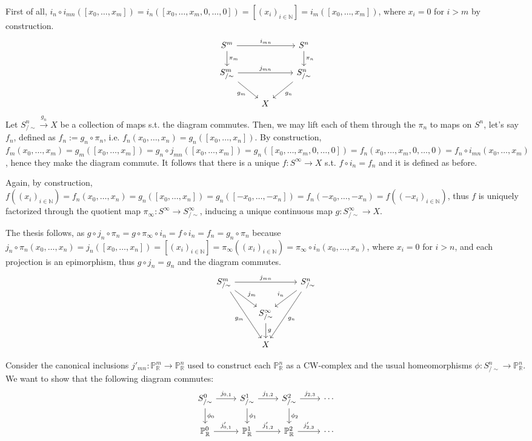 \documentclass{article}
\newcommand{\numberset}{\mathbb}
\newcommand{\N}{\numberset{N}}
\newcommand{\R}{\numberset{R}}
\newcommand{\Ps}{\mathbb{P}}
\begin{document}
First of all, $i_n\circ i_{mn}([x_0,\ldots,x_m])=i_n([x_0,\ldots,x_m,0,\ldots,0])=[(x_i)_{i\in\N}]=i_m([x_0,\ldots,x_m])$, where $x_i=0$ for $i>m$ by construction.
\[
  \begin{tikzcd}
    S^m\arrow{d}{\pi_m}\arrow{rr}{i_{mn}} & & S^n\arrow{d}{\pi_n} \\
    S^m_{/\sim}\arrow{rr}{j_{mn}}\arrow[swap]{dr}{g_m} & & S^n_{/\sim}\arrow{dl}{g_n} \\
    & X
\end{tikzcd}
\]
Let $S^n_{/\sim}\xrightarrow{g_n} X$ be a collection of maps s.t. the diagram commutes. Then, we may lift each of them through the $\pi_n$ to maps on $S^n$, let's say $f_n$, defined as $f_n:=g_n\circ\pi_n$, i.e. $f_n(x_0,\ldots,x_n)=g_n([x_0,\ldots,x_n])$. By construction, $f_m(x_0,\ldots,x_m)=g_m([x_0,\ldots,x_m])=g_n\circ j_{mn}([x_0,\ldots,x_m])=g_n([x_0,\ldots,x_m,0,\ldots,0])=f_n(x_0,\ldots,x_m,0,\ldots,0)=f_n\circ i_{mn}(x_0,\ldots,x_m)$, hence they make the diagram commute. It follows that there is a unique $f:S^{\infty}\rightarrow X$ s.t. $f\circ i_n=f_n$ and it is defined as before.

Again, by construction, $f((x_i)_{i\in\N})=f_n(x_0,\ldots,x_n)=g_n([x_0,\ldots,x_n])=g_n([-x_0,\ldots,-x_n])=f_n(-x_0,\ldots,-x_n)=f((-x_i)_{i\in\N})$, thus $f$ is uniquely factorized through the quotient map $\pi_{\infty}:S^{\infty}\rightarrow S^{\infty}_{/\sim}$, inducing a unique continuous map $g:S^{\infty}_{/\sim}\rightarrow X$.

The thesis follows, as $g\circ j_n\circ\pi_n=g\circ \pi_{\infty}\circ i_n=f\circ i_n=f_n=g_n\circ\pi_n$ because $j_n\circ\pi_n(x_0,\ldots,x_n)=j_n([x_0,\ldots,x_n])=[(x_i)_{i\in\N}]=\pi_{\infty}((x_i)_{i\in\N})=\pi_{\infty}\circ i_n(x_0,\ldots,x_n)$, where $x_i=0$ for $i>n$, and each projection is an epimorphism, thus $g\circ j_n=g_n$ and the diagram commutes.
\[
  \begin{tikzcd}
    S^m_{/\sim}\arrow{rr}{j_{mn}}\arrow{dr}{j_m}\arrow[swap]{ddr}{g_m} & & S^n_{/\sim}\arrow[swap]{dl}{i_n}\arrow{ddl}{g_n} \\
    & S^{\infty}_{/\sim}\arrow{d}{g} \\
    & X
  \end{tikzcd}
\]

Consider the canonical inclusions $j'_{mn}:\Ps^m_{\R}\rightarrow\Ps^n_{\R}$ used to construct each $\Ps^n_{\R}$ as a CW-complex and the usual homeomorphisms $\phi:S^n_{/\sim}\rightarrow\Ps^n_{\R}$. We want to show that the following diagram commutes:
\[
  \begin{tikzcd}
    S^0_{/\sim}\arrow{r}{j_{0,1}}\arrow{d}{\phi_0} & S^1_{/\sim}\arrow{r}{j_{1,2}}\arrow{d}{\phi_1} & S^2_{/\sim}\arrow{r}{j_{2,3}}\arrow{d}{\phi_2} & \cdots \\
    \Ps^0_{\R}\arrow{r}{j'_{0,1}} & \Ps^1_{\R}\arrow{r}{j'_{1,2}} & \Ps^2_{\R}\arrow{r}{j'_{2,3}} & \cdots
  \end{tikzcd}
\]
\end{document}
